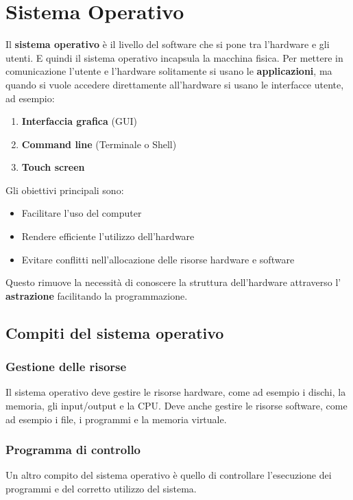 \documentclass[a4paper]{article}
\begin{document}


\tableofcontents
\pagebreak

\section{Sistema Operativo}
Il \textbf{sistema operativo} è il livello del software che si pone tra l'hardware
e gli utenti. E quindi il sistema operativo incapsula la macchina fisica.
Per mettere in comunicazione l'utente e l'hardware solitamente si usano le 
\textbf{applicazioni}, ma quando si vuole accedere direttamente all'hardware
si usano le interfacce utente, ad esempio:
\begin{enumerate}
  \item \textbf{Interfaccia grafica} (GUI)
  \item \textbf{Command line} (Terminale o Shell)
  \item \textbf{Touch screen}
\end{enumerate}
\noindent
Gli obiettivi principali sono:
\begin{itemize}
  \item Facilitare l'uso del computer
  \item Rendere efficiente l'utilizzo dell'hardware
  \item Evitare conflitti nell'allocazione delle risorse hardware e software
\end{itemize}
Questo rimuove la necessità di conoscere la struttura dell'hardware attraverso l'
\textbf{astrazione} facilitando la programmazione.

\subsection{Compiti del sistema operativo}
\subsubsection{Gestione delle risorse}
Il sistema operativo deve gestire le risorse hardware, come ad esempio i dischi, la memoria,
gli input/output e la CPU. Deve anche gestire le risorse software, come ad esempio i file,
i programmi e la memoria virtuale.

\subsubsection{Programma di controllo}
Un altro compito del sistema operativo è quello di controllare l'esecuzione dei programmi
e del corretto utilizzo del sistema.
\end{document}
